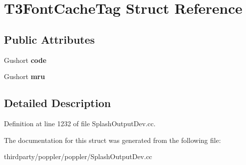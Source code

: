 \hypertarget{struct_t3_font_cache_tag}{}\section{T3\+Font\+Cache\+Tag Struct Reference}
\label{struct_t3_font_cache_tag}
\subsection*{Public Attributes}
\begin{DoxyCompactItemize}
\item 
\mbox{\label{struct_t3_font_cache_tag_a51c78e3c39eb42121e8dc5408ef0c0b4}} 
Gushort {\bfseries code}
\item 
\mbox{\label{struct_t3_font_cache_tag_a7f9b57c7b4c3f1926f341b3fc5654bc0}} 
Gushort {\bfseries mru}
\end{DoxyCompactItemize}


\subsection{Detailed Description}


Definition at line 1232 of file Splash\+Output\+Dev.\+cc.



The documentation for this struct was generated from the following file\+:\begin{DoxyCompactItemize}
\item 
thirdparty/poppler/poppler/Splash\+Output\+Dev.\+cc\end{DoxyCompactItemize}
